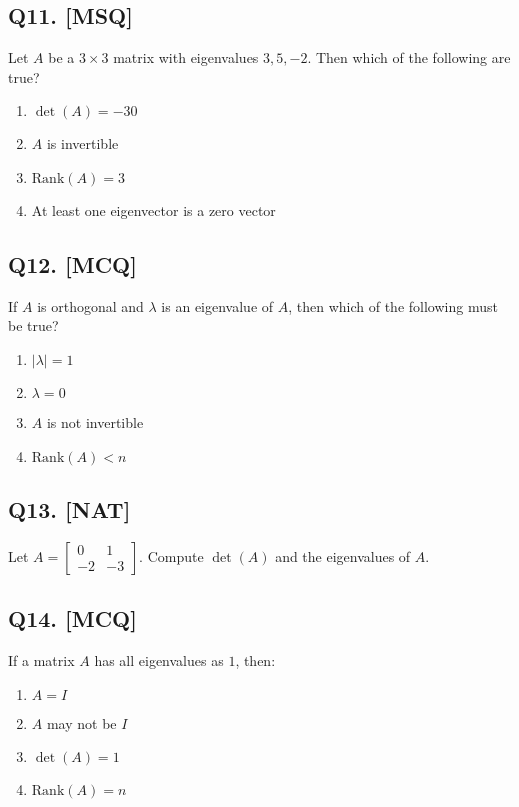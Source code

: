 \subsection*{Q11. [MSQ]}
Let $A$ be a $3 \times 3$ matrix with eigenvalues $3, 5, -2$. Then which of the following are true?

\begin{enumerate}[label=(\alph*)]
    \item $\det(A) = -30$
    \item $A$ is invertible
    \item $\text{Rank}(A) = 3$
    \item At least one eigenvector is a zero vector
\end{enumerate}

\subsection*{Q12. [MCQ]}
If $A$ is orthogonal and $\lambda$ is an eigenvalue of $A$, then which of the following must be true?

\begin{enumerate}[label=(\alph*)]
    \item $|\lambda| = 1$
    \item $\lambda = 0$
    \item $A$ is not invertible
    \item $\text{Rank}(A) < n$
\end{enumerate}

\subsection*{Q13. [NAT]}
Let $A = \begin{bmatrix} 0 & 1 \\ -2 & -3 \end{bmatrix}$. Compute $\det(A)$ and the eigenvalues of $A$.

\subsection*{Q14. [MCQ]}
If a matrix $A$ has all eigenvalues as $1$, then:

\begin{enumerate}[label=(\alph*)]
    \item $A = I$ 
    \item $A$ may not be $I$ 
    \item $\det(A) = 1$ 
    \item $\text{Rank}(A) = n$
\end{enumerate}

